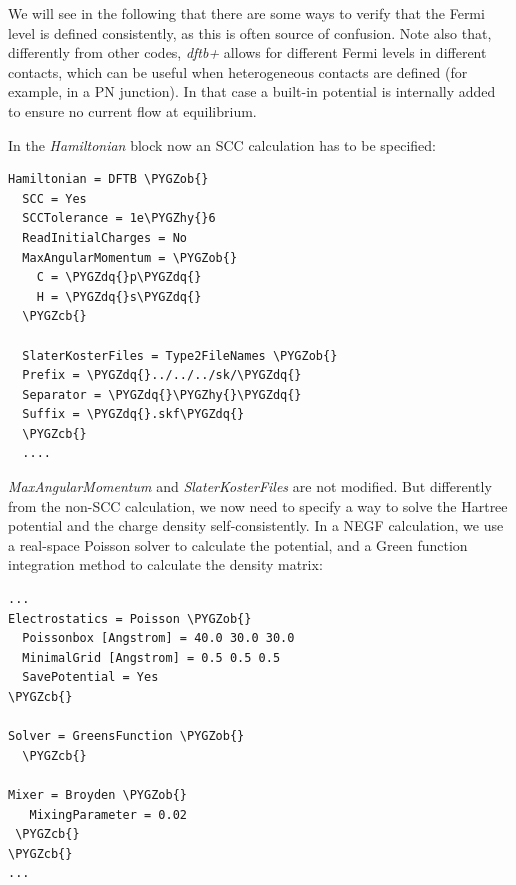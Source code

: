 \documentclass[a4paper,11pt,english]{sphinxmanual}
\def\PYGZob{\char`\{}
\def\PYGZcb{\char`\}}
\def\PYGZhy{\char`\-}
\def\PYGZdq{\char`\"}
\begin{document}
{{We will see in the following that there are some ways to verify that
the Fermi level is defined consistently, as this is often source of
confusion. Note also that, differently from other codes, \emph{dftb+} allows
for different Fermi levels in different contacts, which can be useful
when heterogeneous contacts are defined (for example, in a PN
junction). In that case a built-in potential is internally added to
ensure no current flow at equilibrium.

In the \emph{Hamiltonian} block now an SCC calculation has to be
specified:

\begin{Verbatim}[commandchars=\\\{\}]
Hamiltonian = DFTB \PYGZob{}
  SCC = Yes
  SCCTolerance = 1e\PYGZhy{}6
  ReadInitialCharges = No
  MaxAngularMomentum = \PYGZob{}
    C = \PYGZdq{}p\PYGZdq{}
    H = \PYGZdq{}s\PYGZdq{}
  \PYGZcb{}

  SlaterKosterFiles = Type2FileNames \PYGZob{}
  Prefix = \PYGZdq{}../../../sk/\PYGZdq{}
  Separator = \PYGZdq{}\PYGZhy{}\PYGZdq{}
  Suffix = \PYGZdq{}.skf\PYGZdq{}
  \PYGZcb{}
  ....
\end{Verbatim}

\emph{MaxAngularMomentum} and \emph{SlaterKosterFiles} are not modified. But
differently from the non-SCC calculation, we now need to specify a way
to solve the Hartree potential and the charge density
self-consistently. In a NEGF calculation, we use a real-space Poisson
solver to calculate the potential, and a Green function integration
method to calculate the density matrix:

\begin{Verbatim}[commandchars=\\\{\}]
...
Electrostatics = Poisson \PYGZob{}
  Poissonbox [Angstrom] = 40.0 30.0 30.0
  MinimalGrid [Angstrom] = 0.5 0.5 0.5
  SavePotential = Yes
\PYGZcb{}

Solver = GreensFunction \PYGZob{}
  \PYGZcb{}

Mixer = Broyden \PYGZob{}
   MixingParameter = 0.02
 \PYGZcb{}
\PYGZcb{}
...
\end{Verbatim}

}}
\end{document}
